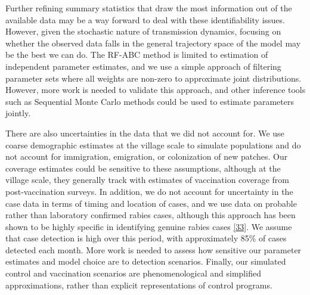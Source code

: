 \documentclass[
  oneside]{book}
\begin{document}
Further refining summary statistics that draw the most information out of the available data may be a way forward to deal with these identifiability issues. However, given the stochastic nature of transmission dynamics, focusing on whether the observed data falls in the general trajectory space of the model may be the best we can do. The RF-ABC method is limited to estimation of independent parameter estimates, and we use a simple approach of filtering parameter sets where all weights are non-zero to approximate joint distributions. However, more work is needed to validate this approach, and other inference tools such as Sequential Monte Carlo methods could be used to estimate parameters jointly.

There are also uncertainties in the data that we did not account for. We use coarse demographic estimates at the village scale to simulate populations and do not account for immigration, emigration, or colonization of new patches. Our coverage estimates could be sensitive to these assumptions, although at the village scale, they generally track with estimates of vaccination coverage from post-vaccination surveys. In addition, we do not account for uncertainty in the case data in terms of timing and location of cases, and we use data on probable rather than laboratory confirmed rabies cases, although this approach has been shown to be highly specific in identifying genuine rabies cases \protect\hyperlink{ref-Hampson2009}{{[}33{]}}. We assume that case detection is high over this period, with approximately 85\% of cases detected each month. More work is needed to assess how sensitive our parameter estimates and model choice are to detection scenarios. Finally, our simulated control and vaccination scenarios are phenomenological and simplified approximations, rather than explicit representations of control programs.
\end{document}
